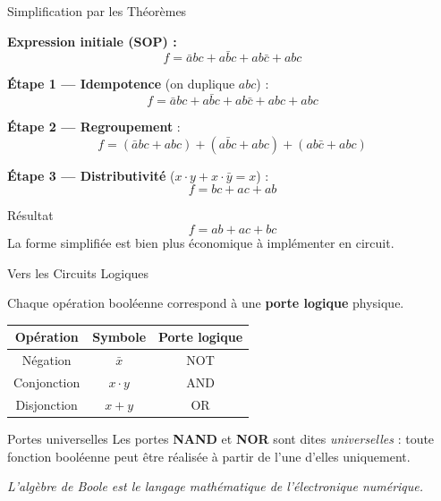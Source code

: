 \begin{frame}{Simplification par les Théorèmes}

    \textbf{Expression initiale (SOP) :}
    \[
        f = \bar{a}bc + a\bar{b}c + ab\bar{c} + abc
    \]

    \vspace{0.3cm}

    \textbf{Étape 1 — Idempotence} (on duplique \(abc\)) :
    \[
        f = \bar{a}bc + a\bar{b}c + ab\bar{c} + abc + abc
    \]

    \vspace{0.2cm}

    \textbf{Étape 2 — Regroupement} :
    \[
        f = (\bar{a}bc + abc) + (a\bar{b}c + abc) + (ab\bar{c} + abc)
    \]

    \vspace{0.2cm}

    \textbf{Étape 3 — Distributivité} (\(x \cdot y + x \cdot \bar{y} = x\)) :
    \[
        f = bc + ac + ab
    \]

    \vspace{0.3cm}

    \begin{exampleblock}{Résultat}
        \[
            f = ab + ac + bc
        \]
        La forme simplifiée est bien plus économique à implémenter en circuit.
    \end{exampleblock}

\end{frame}

\begin{frame}{Vers les Circuits Logiques}

    Chaque opération booléenne correspond à une \textbf{porte logique} physique.

    \vspace{0.5cm}

    \centering
    \begin{tabular}{|c|c|c|}
        \hline
        \textbf{Opération} & \textbf{Symbole} & \textbf{Porte logique} \\
        \hline
        Négation & \(\bar{x}\) & NOT \\
        Conjonction & \(x \cdot y\) & AND \\
        Disjonction & \(x + y\) & OR \\
        \hline
    \end{tabular}

    \vspace{0.6cm}

    \begin{block}{Portes universelles}
        Les portes \textbf{NAND} et \textbf{NOR} sont dites \textit{universelles} : toute fonction booléenne peut être réalisée à partir de l'une d'elles uniquement.
    \end{block}

    \vspace{0.3cm}
    \centering
    \textit{L'algèbre de Boole est le langage mathématique de l'électronique numérique.}

\end{frame}

